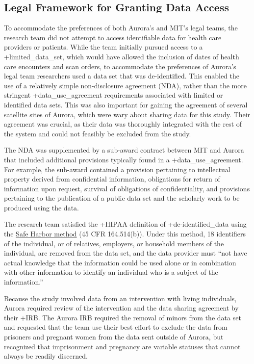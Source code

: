 \documentclass[
]{book}
\begin{document}
\hypertarget{legal-framework-for-granting-data-access-4}{%
\subsection{Legal Framework for Granting Data Access}\label{legal-framework-for-granting-data-access-4}}

To accommodate the preferences of both Aurora's and MIT's legal teams, the research team did not attempt to access identifiable data for health care providers or patients. While the team initially pursued access to a +limited\_data\_set\textbar, which would have allowed the inclusion of dates of health care encounters and scan orders, to accommodate the preferences of Aurora's legal team researchers used a data set that was de-identified. This enabled the use of a relatively simple non-disclosure agreement (NDA), rather than the more stringent +data\_use\_agreement\textbar{} requirements associated with limited or identified data sets. This was also important for gaining the agreement of several satellite sites of Aurora, which were wary about sharing data for this study. Their agreement was crucial, as their data was thoroughly integrated with the rest of the system and could not feasibly be excluded from the study.

The NDA was supplemented by a sub-award contract between MIT and Aurora that included additional provisions typically found in a +data\_use\_agreement\textbar. For example, the sub-award contained a provision pertaining to intellectual property derived from confidential information, obligations for return of information upon request, survival of obligations of confidentiality, and provisions pertaining to the publication of a public data set and the scholarly work to be produced using the data.

The research team satisfied the +HIPAA\textbar{} definition of +de-identified\_data\textbar{} using the \href{https://www.hhs.gov/hipaa/for-professionals/privacy/special-topics/de-identification/index.html\#safeharborguidance}{Safe Harbor method} (45 CFR 164.514(b)). Under this method, 18 identifiers of the individual, or of relatives, employers, or household members of the individual, are removed from the data set, and the data provider must ``not have actual knowledge that the information could be used alone or in combination with other information to identify an individual who is a subject of the information.''

Because the study involved data from an intervention with living individuals, Aurora required review of the intervention and the data sharing agreement by their +IRB\textbar. The Aurora IRB required the removal of minors from the data set and requested that the team use their best effort to exclude the data from prisoners and pregnant women from the data sent outside of Aurora, but recognized that imprisonment and pregnancy are variable statuses that cannot always be readily discerned.
\end{document}
